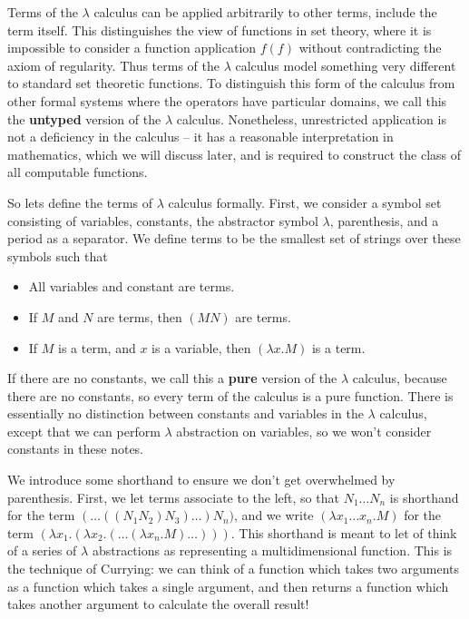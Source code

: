 Terms of the $\lambda$ calculus can be applied arbitrarily to other terms, include the term itself. This distinguishes the view of functions in set theory, where it is impossible to consider a function application $f(f)$ without contradicting the axiom of regularity. Thus terms of the $\lambda$ calculus model something very different to standard set theoretic functions. To distinguish this form of the calculus from other formal systems where the operators have particular domains, we call this the {\bf untyped} version of the $\lambda$ calculus. Nonetheless, unrestricted application is not a deficiency in the calculus -- it has a reasonable interpretation in mathematics, which we will discuss later, and is required to construct the class of all computable functions.

So lets define the terms of $\lambda$ calculus formally. First, we consider a symbol set consisting of variables, constants, the abstractor symbol $\lambda$, parenthesis, and a period as a separator. We define terms to be the smallest set of strings over these symbols such that
%
\begin{itemize}
    \item All variables and constant are terms.
    \item If $M$ and $N$ are terms, then $(MN)$ are terms.
    \item If $M$ is a term, and $x$ is a variable, then $(\lambda x.M)$ is a term.
\end{itemize}
%
If there are no constants, we call this a {\bf pure} version of the $\lambda$ calculus, because there are no constants, so every term of the calculus is a pure function. There is essentially no distinction between constants and variables in the $\lambda$ calculus, except that we can perform $\lambda$ abstraction on variables, so we won't consider constants in these notes.

We introduce some shorthand to ensure we don't get overwhelmed by parenthesis. First, we let terms associate to the left, so that $N_1 \dots N_n$ is shorthand for the term $( \dots ((N_1 N_2) N_3) \dots ) N_n)$, and we write $(\lambda x_1 \dots x_n.M)$ for the term $(\lambda x_1.(\lambda x_2.(\dots(\lambda x_n.M)\dots)))$. This shorthand is meant to let of think of a series of $\lambda$ abstractions as representing a multidimensional function. This is the technique of Currying: we can think of a function which takes two arguments as a function which takes a single argument, and then returns a function which takes another argument to calculate the overall result!

